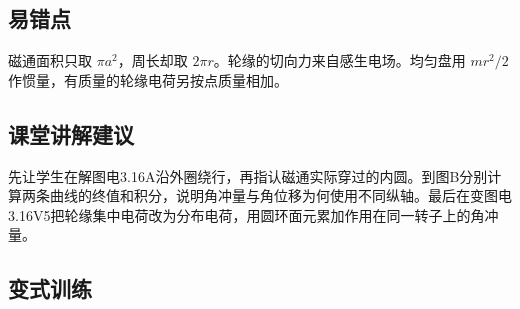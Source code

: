 \documentclass[UTF8,fontset=fandol,a4paper,11pt]{ctexart}
\begin{document}
\subsection*{易错点}

磁通面积只取 $\pi a^2$，周长却取 $2\pi r$。轮缘的切向力来自感生电场。均匀盘用 $mr^2/2$ 作惯量，有质量的轮缘电荷另按点质量相加。



\subsection*{课堂讲解建议}

先让学生在解图电3.16A沿外圈绕行，再指认磁通实际穿过的内圆。到图B分别计算两条曲线的终值和积分，说明角冲量与角位移为何使用不同纵轴。最后在变图电3.16V5把轮缘集中电荷改为分布电荷，用圆环面元累加作用在同一转子上的角冲量。


\subsection*{变式训练}
\end{document}

